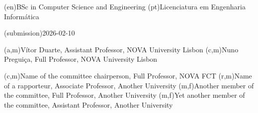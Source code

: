 \ntauthordegree(en){BSc in Computer Science and Engineering}
\ntauthordegree(pt){Licenciatura em Engenharia Informática}



\ntdate(submission){2026-02-10}



(a,m){Vítor Duarte, Assistant Professor, NOVA University Lisbon}
(c,m){Nuno Preguiça, Full Professor, NOVA University Lisbon}



(c,m){Name of the committee chairperson, Full Professor, NOVA FCT}
(r,m){Name of a rapporteur, Associate Professor, Another University}
(m,f){Another member of the committee, Full Professor, Another University}
(m,f){Yet another member of the committee, Assistant Professor, Another University}
